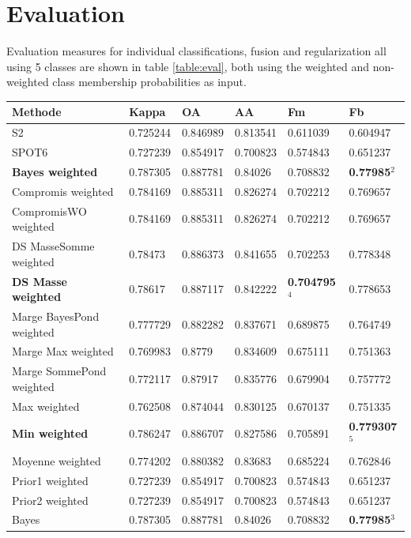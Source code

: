 \documentclass[10pt]{article}
\begin{document}
\section{Evaluation}
Evaluation measures for individual classifications, fusion and regularization all using 5 classes are shown in table \ref{table:eval}, both using the weighted and non-weighted class membership probabilities as input.
\begin{table}[H]
\centering
\begin{tabular}{llllll}
\textbf{Methode} & \textbf{Kappa} & \textbf{OA} & \textbf{AA} & \textbf{Fm} & \textbf{Fb}\\\hline\hline
S2 & 0.725244 & 0.846989 & 0.813541 & 0.611039 & 0.604947\\\hline
SPOT6 & 0.727239 & 0.854917 & 0.700823 & 0.574843 & 0.651237\\\hline
\textbf{Bayes weighted} & 0.787305 & 0.887781 & 0.84026 & 0.708832 & \textbf{0.77985$^2$}\\\hline
Compromis weighted & 0.784169 & 0.885311 & 0.826274 & 0.702212 & 0.769657\\\hline
CompromisWO weighted & 0.784169 & 0.885311 & 0.826274 & 0.702212 & 0.769657\\\hline
DS MasseSomme weighted & 0.78473 & 0.886373 & 0.841655 & 0.702253 & 0.778348\\\hline
\textbf{DS Masse weighted} & 0.78617 & 0.887117 & 0.842222 & \textbf{0.704795$^4$} & 0.778653\\\hline
Marge BayesPond weighted & 0.777729 & 0.882282 & 0.837671 & 0.689875 & 0.764749\\\hline
Marge Max weighted & 0.769983 & 0.8779 & 0.834609 & 0.675111 & 0.751363\\\hline
Marge SommePond weighted & 0.772117 & 0.87917 & 0.835776 & 0.679904 & 0.757772\\\hline
Max weighted & 0.762508 & 0.874044 & 0.830125 & 0.670137 & 0.751335\\\hline
\textbf{Min weighted} & 0.786247 & 0.886707 & 0.827586 & 0.705891 & \textbf{0.779307$^5$}\\\hline
Moyenne weighted & 0.774202 & 0.880382 & 0.83683 & 0.685224 & 0.762846\\\hline
Prior1 weighted & 0.727239 & 0.854917 & 0.700823 & 0.574843 & 0.651237\\\hline
Prior2 weighted & 0.727239 & 0.854917 & 0.700823 & 0.574843 & 0.651237\\\hline
Bayes & 0.787305 & 0.887781 & 0.84026 & 0.708832 & \textbf{0.77985$^3$}\\\hline

\end{tabular}
\end{table}
\end{document}
